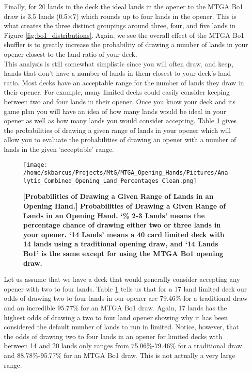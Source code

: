 \documentclass[oneside]{book}   %
\begin{document}
Finally, for 20 lands in the deck the ideal lands in the opener to the MTGA Bo1 draw is 3.5 lands (0.5$\times$7) which rounds up to four lands in the opener. This is what creates the three distinct groupings around three, four, and five lands in Figure \ref{fig:bo1_distributions}. Again, we see the overall effect of the MTGA Bo1 shuffler is to greatly increase the probability of drawing a number of lands in your opener closest to the land ratio of your deck. \\

This analysis is still somewhat simplistic since you will often draw, and keep, hands that don't have a number of lands in them closest to your deck's land ratio. Most decks have an acceptable range for the number of lands they draw in their opener. For example, many limited decks could easily consider keeping between two and four lands in their opener. Once you know your deck and its game plan you will have an idea of how many lands would be ideal in your opener as well as how many lands you would consider accepting. Table \ref{fig:combined} gives the probabilities of drawing a given range of lands in your opener which will allow you to evaluate the probabilities of drawing an opener with a number of lands in the given `acceptable' range.\\

 	\begin{figure}[!ht]
	\centering
	\centerline{\texttt{[image: /home/skbarcus/Projects/MtG/MTGA\_Opening\_Hands/Pictures/Analytic\_Combined\_Opening\_Land\_Percentages\_Clean.png]}}
	[\bf{Probabilities of Drawing a Given Range of Lands in an Opening Hand.}]{
	{\bf{Probabilities of Drawing a Given Range of Lands in an Opening Hand.}} `\% 2-3 Lands' means the percentage chance of drawing either two or three lands in your opener. `14 Lands' means a 40 card limited deck with 14 lands using a traditional opening draw, and `14 Lands Bo1' is the same except for using the MTGA Bo1 opening draw.}
	\label{fig:combined}
	\end{figure}	
	
Let us assume that we have a deck that would generally consider accepting any opener with two to four lands. Table \ref{fig:combined} tells us that for a 17 land limited deck our odds of drawing two to four lands in our opener are 79.46\% for a traditional draw and an incredible 95.77\% for an MTGA Bo1 draw. Again, 17 lands has the highest odds of drawing a two to four land opener showing why it has been considered the default number of lands to run in limited. Notice, however, that the odds of drawing two to four lands in an opener for limited decks with between 14 and 20 lands only ranges from 75.06\%-79.46\% for a traditional draw and 88.78\%-95.77\% for an MTGA Bo1 draw. This is not actually a very large range. \\
\end{document}
